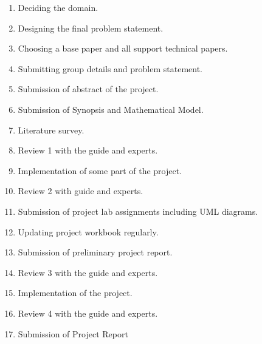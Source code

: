 \documentclass[oneside,a4paper,12pt]{book}
\begin{document}
\setlength{\parskip}{0.0pt}
\begin{enumerate}
	\item Deciding the domain.\par

	\item Designing the final problem statement. \par

	\item Choosing a base paper and all support technical papers.\par

	\item Submitting group details and problem statement.\par

	\item Submission of abstract of the project.\par

	\item Submission of Synopsis and Mathematical Model.\par

	\item Literature survey.\par

	\item Review 1 with the guide and experts.\par

	\item Implementation of some part of the project.\par

	\item Review 2 with guide and experts.\par

	\item Submission of project lab assignments including UML diagrams.\par

	\item Updating project workbook regularly. \par

	\item Submission of preliminary project report.\par

	\item Review 3 with the guide and experts.\par

	\item Implementation of the project.\par

	\item Review 4 with the guide and experts.\par

	\item Submission of Project Report
\end{enumerate}\par
\end{document}
